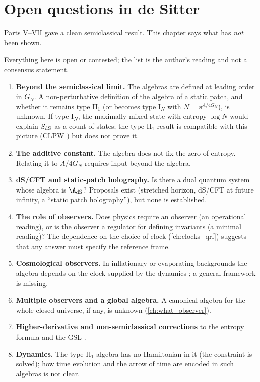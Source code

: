 \chapter{Open questions in de Sitter}\label{ch:open_ds}

\begin{physmotiv}
Parts V--VII gave a clean semiclassical result. This chapter says what has \emph{not} been shown.
\end{physmotiv}

\begin{unsettled}
Everything here is open or contested; the list is the author's reading and not a consensus statement.
\end{unsettled}

\begin{enumerate}
\item \textbf{Beyond the semiclassical limit.} The algebras are defined at leading order in $G_N$. A non-perturbative definition of the algebra of a static patch, and whether it remains type II$_1$ (or becomes type I$_N$ with $N=\ee^{A/4G_N}$), is unknown. If type I$_N$, the maximally mixed state with entropy $\log N$ would explain $S_{\rm dS}$ as a count of states; the type II$_1$ result is compatible with this picture (CLPW \cite{CLPW2023}) but does not prove it.
\item \textbf{The additive constant.} The algebra does not fix the zero of entropy. Relating it to $A/4G_N$ requires input beyond the algebra.
\item \textbf{dS/CFT and static-patch holography.} Is there a dual quantum system whose algebra is $\A_{\rm dS}$? Proposals exist (stretched horizon, dS/CFT at future infinity, a ``static patch holography''), but none is established.
\item \textbf{The role of observers.} Does physics require an observer (an operational reading), or is the observer a regulator for defining invariants (a minimal reading)? The dependence on the choice of clock (\cref{ch:clocks_qrf}) suggests that any answer must specify the reference frame.
\item \textbf{Cosmological observers.} In inflationary or evaporating backgrounds the algebra depends on the clock supplied by the dynamics \cite{ChenPenington2024}; a general framework is missing.
\item \textbf{Multiple observers and a global algebra.} A canonical algebra for the whole closed universe, if any, is unknown (\cref{ch:what_observer}).
\item \textbf{Higher-derivative and non-semiclassical corrections} to the entropy formula and the GSL \cite{FaulknerSperanza2024}.
\item \textbf{Dynamics.} The type II$_1$ algebra has no Hamiltonian in it (the constraint is solved); how time evolution and the arrow of time are encoded in such algebras is not clear.
\end{enumerate}

